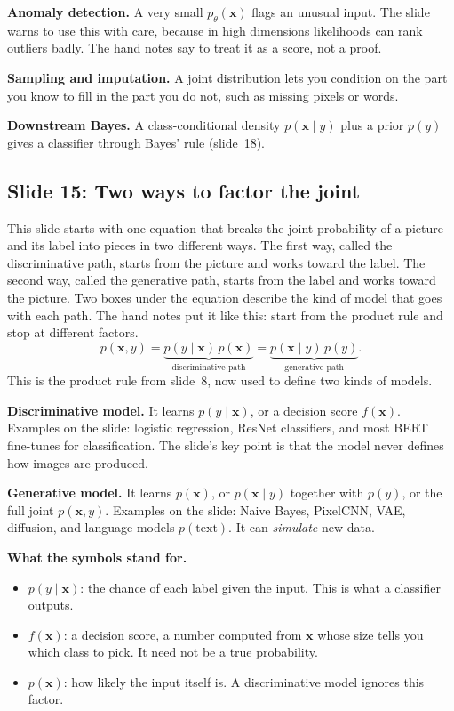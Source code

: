 \textbf{Anomaly detection.} A very small $p_\theta(\mathbf{x})$ flags an unusual input. The slide warns to use this with care, because in high dimensions likelihoods can rank outliers badly. The hand notes say to treat it as a score, not a proof.

\textbf{Sampling and imputation.} A joint distribution lets you condition on the part you know to fill in the part you do not, such as missing pixels or words.

\textbf{Downstream Bayes.} A class-conditional density $p(\mathbf{x}\mid y)$ plus a prior $p(y)$ gives a classifier through Bayes' rule (slide~18).

\subsection*{Slide 15: Two ways to factor the joint}

This slide starts with one equation that breaks the joint probability of a picture and its label into pieces in two different ways. The first way, called the discriminative path, starts from the picture and works toward the label. The second way, called the generative path, starts from the label and works toward the picture. Two boxes under the equation describe the kind of model that goes with each path. The hand notes put it like this: start from the product rule and stop at different factors.
\[
p(\mathbf{x},y)=\underbrace{p(y\mid\mathbf{x})\,p(\mathbf{x})}_{\text{discriminative path}}=\underbrace{p(\mathbf{x}\mid y)\,p(y)}_{\text{generative path}}.
\]
This is the product rule from slide~8, now used to define two kinds of models.

\textbf{Discriminative model.} It learns $p(y\mid\mathbf{x})$, or a decision score $f(\mathbf{x})$. Examples on the slide: logistic regression, ResNet classifiers, and most BERT fine-tunes for classification. The slide's key point is that the model never defines how images are produced.

\textbf{Generative model.} It learns $p(\mathbf{x})$, or $p(\mathbf{x}\mid y)$ together with $p(y)$, or the full joint $p(\mathbf{x},y)$. Examples on the slide: Naive Bayes, PixelCNN, VAE, diffusion, and language models $p(\text{text})$. It can \textit{simulate} new data.

\textbf{What the symbols stand for.}
\begin{itemize}
\item $p(y\mid\mathbf{x})$: the chance of each label given the input. This is what a classifier outputs.
\item $f(\mathbf{x})$: a decision score, a number computed from $\mathbf{x}$ whose size tells you which class to pick. It need not be a true probability.
\item $p(\mathbf{x})$: how likely the input itself is. A discriminative model ignores this factor.
\end{itemize}

